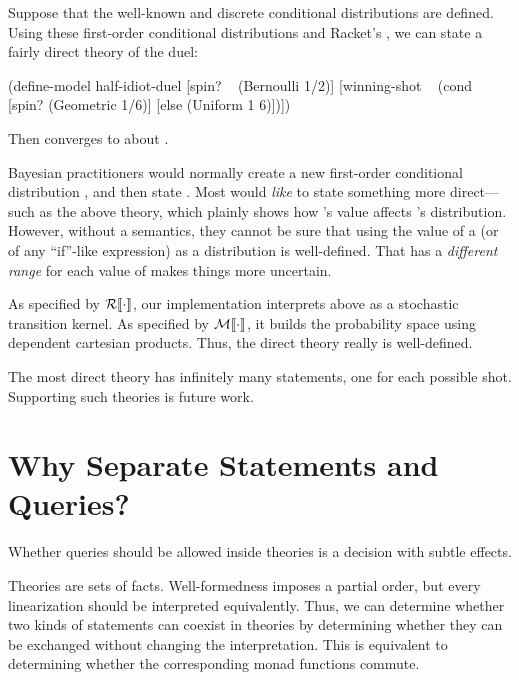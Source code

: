 Suppose that the well-known  and discrete  conditional distributions are defined. Using these first-order conditional distributions and Racket's , we can state a fairly direct theory of the duel:
\begin{center}
\singlespacing
\begin{schemedisplay}
(define-model half-idiot-duel
  [spin? ~ (Bernoulli 1/2)]
  [winning-shot ~ (cond [spin?  (Geometric 1/6)]
                        [else   (Uniform 1 6)])])
\end{schemedisplay}
\end{center}
Then  converges to about .

Bayesian practitioners would normally create a new first-order conditional distribution , and then state . Most would \textit{like} to state something more direct---such as the above theory, which plainly shows how 's value affects 's distribution. However, without a semantics, they cannot be sure that using the value of a  (or of any ``if''-like expression) as a distribution is well-defined. That  has a \textit{different range} for each value of  makes things more uncertain.

As specified by $\mathcal{R}\!\left\llbracket{\cdot}\right\rrbracket$, our implementation interprets  above as a stochastic transition kernel. As specified by $\mathcal{M}\!\left\llbracket{\cdot}\right\rrbracket$, it builds the probability space using dependent cartesian products. Thus, the direct theory really is well-defined.

The most direct theory has infinitely many statements, one for each possible shot. Supporting such theories is future work.


\section{Why Separate Statements and Queries?}
\label{sec:commutativity}

Whether queries should be allowed inside theories is a decision with subtle effects.

Theories are sets of facts. Well-formedness imposes a partial order, but every linearization should be interpreted equivalently. Thus, we can determine whether two kinds of statements can coexist in theories by determining whether they can be exchanged without changing the interpretation. This is equivalent to determining whether the corresponding monad functions commute.


